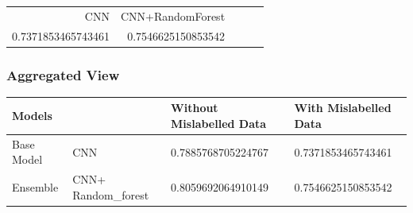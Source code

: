 \documentclass{article}
\begin{document}
\begin{table}[H]
    \centering
    \begin{tabular}{rrrrr}
        CNN &  CNN+RandomForest   \\
        0.7371853465743461 &       0.7546625150853542  \\
    \end{tabular}
\end{table}


\subsubsection{Aggregated View}

\begin{table}[H]
    \begin{tabular}{|l|l|l|l|}
    \hline
    \multicolumn{2}{|l|}{Models}     & Without Mislabelled Data & With Mislabelled Data \\ \hline
    Base Model & CNN                 & 0.7885768705224767       & 0.7371853465743461    \\ \hline
    Ensemble   & CNN+ Random\_forest & 0.8059692064910149       & 0.7546625150853542    \\ \hline
    \end{tabular}
\end{table}
\nocite{*}




\end{document}

